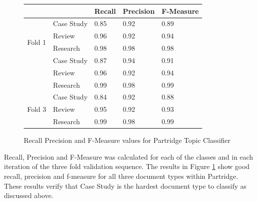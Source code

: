\begin{figure}[!th]

\centering
\begin{tabular}{| l | l | l | l | l |}
\hline
&        &\textbf{Recall}&\textbf{Precision}&\textbf{F-Measure}\\
\hline
\hline
\multirow{4}{*}{Fold 1} & Case Study & 0.85 & 0.92 & 0.89 \\
                        & Review     & 0.96 & 0.92 & 0.94 \\
                        & Research   & 0.98 & 0.98 & 0.98 \\
\hline

\multirow{4}{*}{Fold 2} & Case Study & 0.87 & 0.94 & 0.91 \\
                        & Review     & 0.96 & 0.92 & 0.94 \\
                        & Research   & 0.99 & 0.98 & 0.99 \\

\hline

\multirow{4}{*}{Fold 3} &Case Study & 0.84 & 0.92 & 0.88 \\
                        & Review    & 0.95 & 0.92 & 0.93 \\
                        & Research  & 0.99 & 0.98 & 0.99 \\


\hline


\end{tabular}

\caption{Recall Precision and F-Measure values for Partridge Topic Classifier}
\label{fig:fmeasure_table}

\end{figure}

Recall, Precision and F-Measure was calculated for each of the classes and in
each iteration of the three fold validation sequence. The results in Figure
\ref{fig:fmeasure_table} show good recall, precision and f-measure for all
three document types within Partridge. These results verify that Case Study is
the hardest document type to classify as discussed above.

